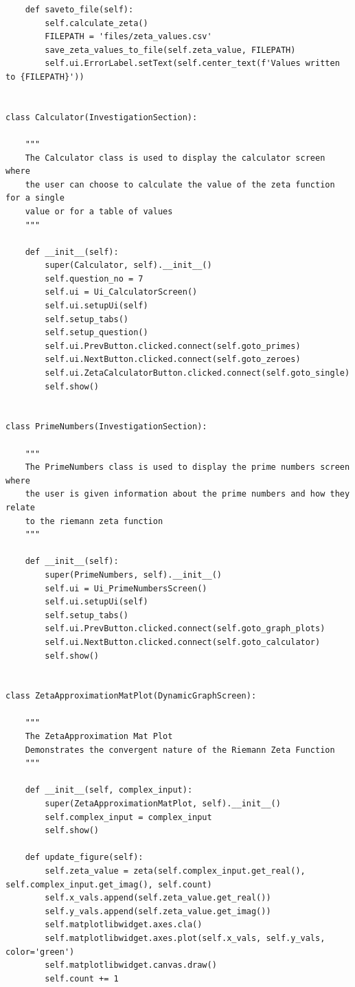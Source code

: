 \documentclass[12pt]{article}
\begin{document}
\begin{lstlisting}
    def saveto_file(self):
        self.calculate_zeta()
        FILEPATH = 'files/zeta_values.csv'
        save_zeta_values_to_file(self.zeta_value, FILEPATH)
        self.ui.ErrorLabel.setText(self.center_text(f'Values written to {FILEPATH}'))


class Calculator(InvestigationSection):

    """
    The Calculator class is used to display the calculator screen where
    the user can choose to calculate the value of the zeta function for a single
    value or for a table of values
    """

    def __init__(self):
        super(Calculator, self).__init__()
        self.question_no = 7
        self.ui = Ui_CalculatorScreen()
        self.ui.setupUi(self)
        self.setup_tabs()
        self.setup_question()
        self.ui.PrevButton.clicked.connect(self.goto_primes)
        self.ui.NextButton.clicked.connect(self.goto_zeroes)
        self.ui.ZetaCalculatorButton.clicked.connect(self.goto_single)
        self.show()


class PrimeNumbers(InvestigationSection):

    """
    The PrimeNumbers class is used to display the prime numbers screen where
    the user is given information about the prime numbers and how they relate
    to the riemann zeta function
    """

    def __init__(self):
        super(PrimeNumbers, self).__init__()
        self.ui = Ui_PrimeNumbersScreen()
        self.ui.setupUi(self)
        self.setup_tabs()
        self.ui.PrevButton.clicked.connect(self.goto_graph_plots)
        self.ui.NextButton.clicked.connect(self.goto_calculator)
        self.show()


class ZetaApproximationMatPlot(DynamicGraphScreen):

    """
    The ZetaApproximation Mat Plot
    Demonstrates the convergent nature of the Riemann Zeta Function
    """

    def __init__(self, complex_input):
        super(ZetaApproximationMatPlot, self).__init__()
        self.complex_input = complex_input
        self.show()

    def update_figure(self):
        self.zeta_value = zeta(self.complex_input.get_real(), self.complex_input.get_imag(), self.count)
        self.x_vals.append(self.zeta_value.get_real())
        self.y_vals.append(self.zeta_value.get_imag())
        self.matplotlibwidget.axes.cla()
        self.matplotlibwidget.axes.plot(self.x_vals, self.y_vals, color='green')
        self.matplotlibwidget.canvas.draw()
        self.count += 1



\end{lstlisting}
\end{document}
